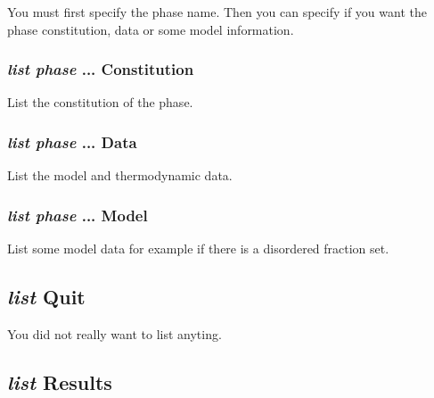 \documentclass[12pt]{article}
\begin{document}
You must first specify the phase name.  Then you can specify if you
want the phase constitution, data or some model information.

\subsubsection{{\em list phase} ... Constitution}

List the constitution of the phase.

\subsubsection{{\em list phase} ... Data}

List the model and thermodynamic data.

\subsubsection{{\em list phase} ... Model}

List some model data for example if there is a disordered fraction set.

\subsection{{\em list} Quit}

You did not really want to list anyting.

\subsection{{\em list} Results}
\end{document}

